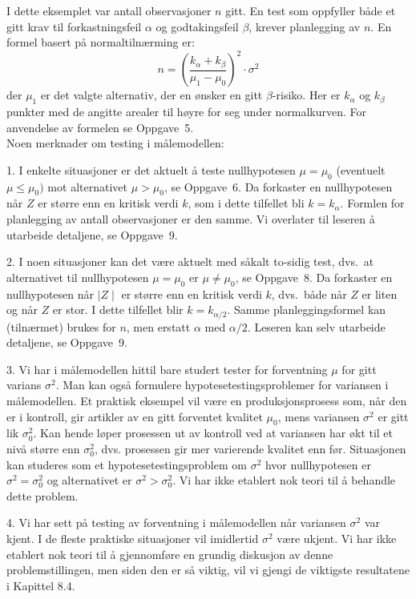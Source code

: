 I dette eksemplet var antall observasjoner $n$ gitt. En test som oppfyller 
både et gitt krav til forkastningsfeil $\alpha$ og godtakingsfeil $\beta$,
krever planlegging av $n$. En formel basert på  normaltilnærming er:
\[  n=(\frac{k_{\alpha} + k_{\beta}}{\mu_1 - \mu_0})^2 \cdot {\sigma}^2   \]
der $\mu_1$ er det valgte alternativ, der en ønsker en gitt $\beta$-risiko.
Her er $k_{\alpha}$ og $k_{\beta}$ punkter med de angitte arealer til høyre
for seg under normalkurven. For anvendelse av formelen se Oppgave~5. \\

\noindent Noen merknader om testing i målemodellen:
                                                   
1. I enkelte situasjoner er det aktuelt å teste
nullhypotesen $\mu={\mu}_0$ (eventuelt $\mu\le{\mu}_0)$ mot
alternativet $\mu> {\mu}_0$, se Oppgave~6. Da forkaster en nullhypotesen 
når $Z$ er større enn en kritisk verdi $k$, som i dette tilfellet bli 
$k=k_{\alpha}$. Formlen for planlegging av antall observasjoner er den samme.
Vi overlater til leseren å utarbeide detaljene, se Oppgave~9. 

2. I noen situasjoner kan det være aktuelt med såkalt to-sidig
test, dvs.\ at alternativet til nullhypotesen $\mu={\mu}_0$ er
$\mu\not={\mu}_0$, se Oppgave~8. Da forkaster en nullhypotesen når 
$\mid Z\mid$ er større enn en kritisk verdi $k$, dvs.\ både når $Z$ 
er liten og når $Z$ er stor. I dette tilfellet blir $k=k_{\alpha/2}$.
Samme planleggingsformel kan (tilnærmet) brukes for $n$, men erstatt
$\alpha$ med ${\alpha}/2$. Leseren kan selv utarbeide detaljene, se Oppgave~9.

3. Vi har i målemodellen hittil bare studert tester for
forventning $\mu$ for gitt varians $\sigma ^2$. Man kan også
formulere hypotesetestingsproblemer for variansen i
målemodellen. Et praktisk eksempel vil være en
produksjons\-prosess som, når den er i kontroll, gir artikler
av en gitt forventet kvalitet ${\mu}_0$, mens variansen $\sigma ^2$
er gitt lik ${\sigma}_0^2$. Kan hende løper prosessen ut av
kontroll ved at variansen har økt til et nivå større
enn ${\sigma}_0^2$, dvs. prosessen gir mer varierende kvalitet
enn før. Situasjonen kan studeres som et
hypotese\-testingsproblem om $\sigma ^2$ hvor nullhypotesen er
$\sigma ^2={\sigma}_0^2$ og alternativet er $\sigma ^2 > {\sigma}_0^2$.
Vi har ikke etablert nok teori til å behandle dette problem.

4. Vi har sett på testing av forventning i målemodellen
når variansen $\sigma ^2$ var kjent. I de fleste praktiske
situasjoner vil imidlertid $\sigma ^2$ være ukjent. Vi har
ikke etablert nok teori til å gjennomføre en grundig
diskusjon av denne problemstillingen, men siden den er så
viktig, vil vi gjengi de viktigste resultatene i Kapittel 8.4. 

